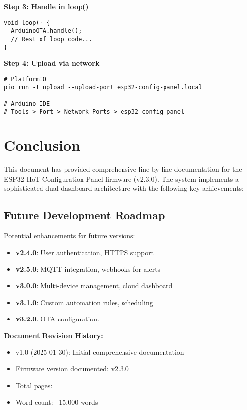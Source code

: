 \documentclass[11pt,a4paper]{article}
\begin{document}
\textbf{Step 3: Handle in loop()}
\begin{verbatim}
void loop() {
  ArduinoOTA.handle();
  // Rest of loop code...
}
\end{verbatim}

\textbf{Step 4: Upload via network}
\begin{verbatim}
# PlatformIO
pio run -t upload --upload-port esp32-config-panel.local

# Arduino IDE
# Tools > Port > Network Ports > esp32-config-panel
\end{verbatim}

\section{Conclusion}

This document has provided comprehensive line-by-line documentation for the ESP32 IIoT Configuration Panel firmware (v2.3.0). The system implements a sophisticated dual-dashboard architecture with the following key achievements:




\subsection{Future Development Roadmap}

Potential enhancements for future versions:

\begin{itemize}[leftmargin=*]
  \item \textbf{v2.4.0}: User authentication, HTTPS support
  \item \textbf{v2.5.0}: MQTT integration, webhooks for alerts
  \item \textbf{v3.0.0}: Multi-device management, cloud dashboard
  \item \textbf{v3.1.0}: Custom automation rules, scheduling
  \item \textbf{v3.2.0}: OTA configuration.
  
\end{itemize}



\vspace{1cm}

\noindent\textbf{Document Revision History:}
\begin{itemize}[leftmargin=*]
  \item v1.0 (2025-01-30): Initial comprehensive documentation
  \item Firmware version documented: v2.3.0
  \item Total pages: \pageref{LastPage}
  \item Word count: ~15,000 words
\end{itemize}

\vspace{1cm}
\end{document}
